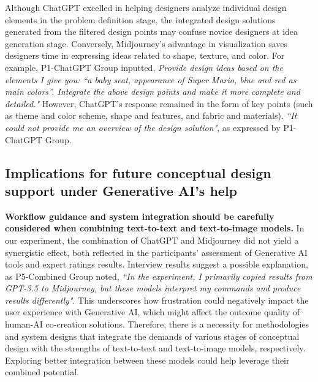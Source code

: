 \documentclass{dsj}
\begin{document}
Although ChatGPT excelled in helping designers analyze individual design elements in the problem definition stage, the integrated design solutions generated from the filtered design points may confuse novice designers at idea generation stage. Conversely, Midjourney's advantage in visualization saves designers time in expressing ideas related to shape, texture, and color. For example, P1-ChatGPT Group inputted, \textit{Provide design ideas based on the elements I give you: ``a baby seat, appearance of Super Mario, blue and red as main colors”. Integrate the above design points and make it more complete and detailed."} However, ChatGPT’s response remained in the form of key points (such as theme and color scheme, shape and features, and fabric and materials). \textit{``It could not provide me an overview of the design solution"}, as expressed by P1-ChatGPT Group.

\subsection{Implications for future conceptual design support under Generative AI’s help}

\textbf{Workflow guidance and system integration should be carefully considered when combining text-to-text and text-to-image models.} In our experiment, the combination of ChatGPT and Midjourney did not yield a synergistic effect, both reflected in the participants' assessment of Generative AI tools and expert ratings results. Interview results suggest a possible explanation, as P5-Combined Group noted, \textit{``In the experiment, I primarily copied results from GPT-3.5 to Midjourney, but these models interpret my commands and produce results differently"}. This underscores how frustration could negatively impact the user experience with Generative AI, which might affect the outcome quality of human-AI co-creation solutions. Therefore, there is a necessity for methodologies and system designs that integrate the demands of various stages of conceptual design with the strengths of text-to-text and text-to-image models, respectively. Exploring better integration between these models could help leverage their combined potential.
\end{document}
